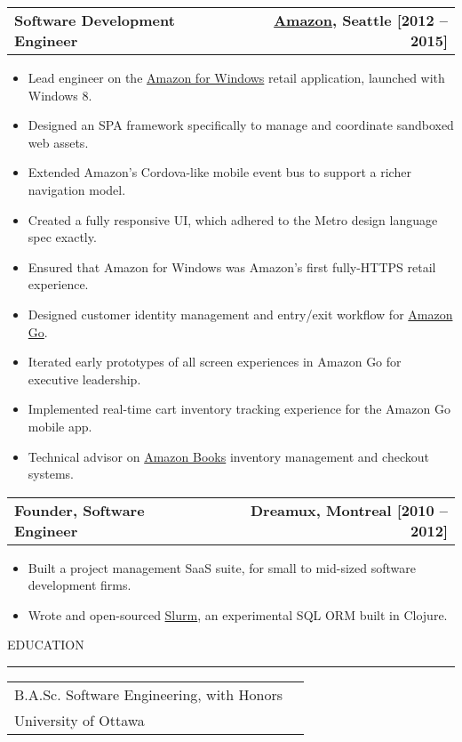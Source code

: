 \documentclass[12pt]{article}
\makeatletter
\newenvironment{justifycolumns}
{\begin{tabular*}{\textwidth}{@{\extracolsep{\fill}} lr@{}}}
{\end{tabular*}}
\newcommand{\row}[2]{#1 & #2 \\}
\newcommand{\rowheading}[2]{\row{\textbf{#1}}{\textbf{#2}}}
\newcommand{\range}[2]{#1 -- #2}
\newcommand{\blockseparation}{\vspace{0.13in}}
\newcommand{\heading}[1]{
	\vspace{0.05in}
	\uppercase{#1}
	\vspace{0.05in}
	\hrule
	\blockseparation
}
\newenvironment{tightbullets}
{\begin{itemize}}
{\end{itemize}}
\newenvironment{bullets}
{\begin{tightbullets}}
{\end{tightbullets} \blockseparation}
\makeatother
\begin{document}
\begin{flushleft}
\begin{justifycolumns}
	\hspace{0.1in}
	\rowheading{Software Development Engineer}{\textnormal{\href{https://amazon.com}{Amazon}, Seattle [\range{2012}{2015}]}}
\end{justifycolumns}
\begin{bullets}
	\item Lead engineer on the \href{http://apps.microsoft.com/windows/en-us/app/amazon/80299018-3dee-418d-8466-374fe9463309}{Amazon for Windows} retail application, launched with Windows 8.
	\item Designed an SPA framework specifically to manage and coordinate sandboxed web assets.
	\item Extended Amazon’s Cordova-like mobile event bus to support a richer navigation model.
	\item Created a fully responsive UI, which adhered to the Metro design language spec exactly.
	\item Ensured that Amazon for Windows was Amazon's first fully-HTTPS retail experience.
	\item Designed customer identity management and entry/exit workflow for \href{https://www.amazon.com/b?ie=UTF8\&node=16008589011}{Amazon Go}.
	\item Iterated early prototypes of all screen experiences in Amazon Go for executive leadership.
	\item Implemented real-time cart inventory tracking experience for the Amazon Go mobile app.
	\item Technical advisor on \href{https://www.amazon.com/amazon-books-university-village-seattle-washington/b?ie=UTF8\&node=17750359011}{Amazon Books} inventory management and checkout systems.
\end{bullets}
\vspace{0.05in}

\begin{justifycolumns}
	\hspace{0.1in}
	\rowheading{Founder, Software Engineer}{\textnormal{Dreamux, Montreal [\range{2010}{2012}]}}
\end{justifycolumns}
\begin{bullets}
	\item Built a project management SaaS suite, for small to mid-sized software development firms.
	\item Wrote and open-sourced \href{https://github.com/amcnamara/slurm}{Slurm}, an experimental SQL ORM built in Clojure.
\end{bullets}

\blockseparation

\heading{Education}
\begin{justifycolumns}
	\row{B.A.Sc. Software Engineering, with Honors}{}
	\row{University of Ottawa}{}
\end{justifycolumns}


\end{flushleft}
\end{document}
